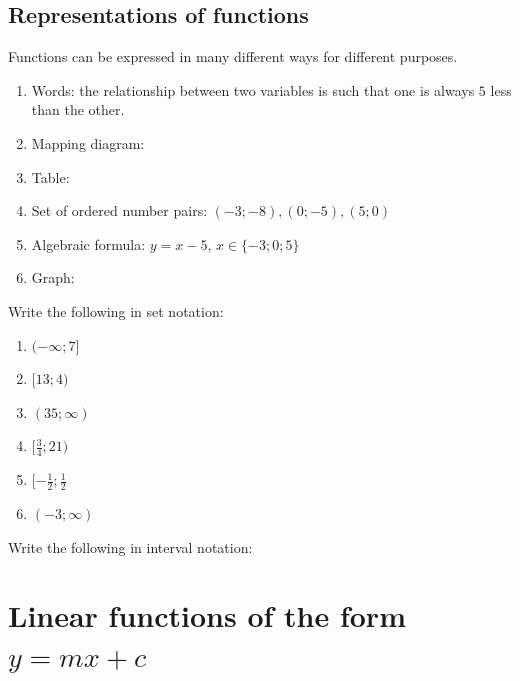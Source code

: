 \subsection*{Representations of functions}
Functions can be expressed in many different ways for different purposes. 
\begin{enumerate}[noitemsep, label=\textbf{\arabic*}. ] 
 \item Words: the relationship between two variables is such that one is always $5$ less than the other.
\item Mapping diagram: 
\item Table: 
\item Set of ordered number pairs: $(-3;-8), (0;-5), (5;0)$
\item Algebraic formula: $y = x-5$, $x \in \{-3; 0; 5\}$
\item Graph:
\end{enumerate}

\begin{exercises}{}
{
Write the following in set notation:
\begin{enumerate}[noitemsep, label=\textbf{\arabic*}. ] 
 \item $(- \infty; 7]$
\item $[13;4)$
\item $(35; \infty)$
\item $[\frac{3}{4}; 21)$
\item $[-\frac{1}{2}; \frac{1}{2}$
\item $(-3; \infty)$
\end{enumerate}

Write the following in interval notation:
\begin{enumerate}[noitemsep, label=\textbf{\arabic*}. ] 
\setcounter{enumi}{6}
 \item $\{p: p \in \mathBB{R}, p \leq 6\}$
 \item $\{k: k \in \mathBB{R}, -5 < k < 5}$
 \item $\{x: x \in \mathBB{R}, x > \frac{1}{5}\}$
 \item $\{z: z \in \mathBB{R}, 21 \leq z < 41\}$
\end{enumerate}

} 
\end{exercises}

\section{Linear functions of the form $y=mx+c$}


